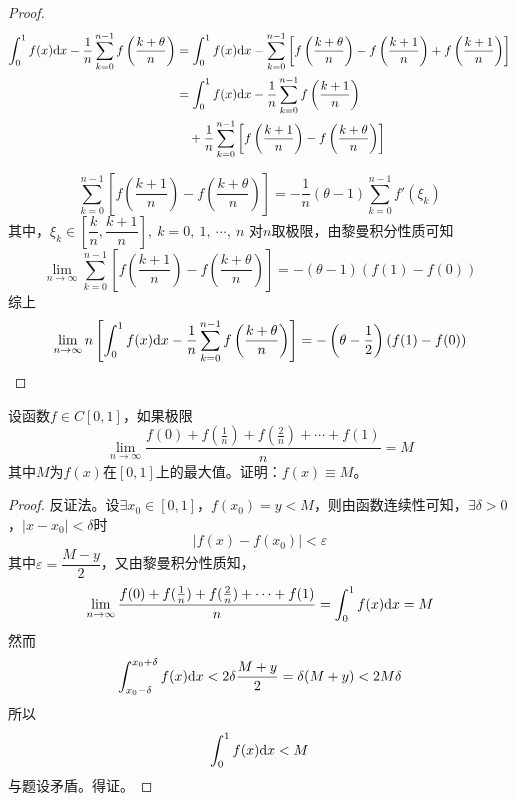 \begin{proof}
    
    \begin{align*}
        \int_{0}^{1}{f(x)}\mathrm{d} x - \dfrac{1}{n}\sum\limits_{k = 0}^{n - 1}{f\left(\dfrac{k + \theta}{n}\right)} & = \int_{0}^{1}{f(x)}\mathrm{d} x - \sum\limits_{k = 0}^{n - 1}{\left[f\left(\dfrac{k + \theta}{n}\right) - f\left(\dfrac{k + 1}{n}\right) + f\left(\dfrac{k + 1}{n}\right)\right]} \\
        & = \int_{0}^{1}{f(x)}\mathrm{d} x - \dfrac{1}{n}\sum\limits_{k = 0}^{n - 1}{f\left(\dfrac{k + 1}{n}\right)} \\
        & \quad + \dfrac{1}{n}\sum\limits_{k = 0}^{n - 1}{\left[f\left(\dfrac{k + 1}{n}\right) - f\left(\dfrac{k + \theta}{n}\right)\right]}
    \end{align*}

    $$\sum\limits_{k = 0}^{n - 1}{\left[f\left(\dfrac{k + 1}{n}\right) - f\left(\dfrac{k + \theta}{n}\right)\right]} = -\dfrac{1}{n}(\theta - 1)\sum\limits_{k = 0}^{n - 1}{f'(\xi_k)}$$
    其中，$\xi_k \in \left[\dfrac{k}{n}, \dfrac{k + 1}{n}\right],\ k = 0,\ 1,\  \cdots,\ n$
    对$n$取极限，由黎曼积分性质可知
    $$\lim\limits_{n\to\infty}{\sum\limits_{k = 0}^{n - 1}{\left[f\left(\dfrac{k + 1}{n}\right) - f\left(\dfrac{k + \theta}{n}\right)\right]}} = -(\theta - 1)(f(1) - f(0))$$
    综上
    $$\lim\limits_{n\to\infty}{n \left[\int_{0}^{1}{f(x)}\mathrm{d} x - \dfrac{1}{n}\sum\limits_{k = 0}^{n - 1}{f\left(\dfrac{k + \theta}{n}\right)}\right]} = -\left(\theta -\dfrac{1}{2}\right) (f(1) - f(0))$$

\end{proof}

\begin{proposition}

    设函数$f \in C[0,1]$，如果极限
    $$\lim\limits_{n\to\infty}{\dfrac{f(0) + f(\frac{1}{n}) + f(\frac{2}{n}) + \cdots + f(1)}{n}} = M$$
    其中$M$为$f(x)$在$[0,1]$上的最大值。证明：$f(x) \equiv M$。

\end{proposition}

\begin{proof}

    反证法。设$\exists x_0 \in [0,1]$，$f(x_0) = y < M$，则由函数连续性可知，$\exists \delta > 0$，$|x - x_0| < \delta$时
    $$|f(x) - f(x_0)| < \varepsilon$$
    其中$\varepsilon = \dfrac{M -y}{2}$，又由黎曼积分性质知，
    $$\lim\limits_{n\to\infty}{\dfrac{f(0) + f(\frac{1}{n}) + f(\frac{2}{n}) + \cdots + f(1)}{n}} = \int_{0}^{1}{f(x)}\mathrm{d} x = M$$
    然而
    $$\int_{x_0 - \delta}^{x_0 + \delta}{f(x)}\mathrm{d} x < 2 \delta \dfrac{M + y}{2} = \delta (M + y) < 2M \delta$$
    所以
    $$\int_{0}^{1}{f(x)}\mathrm{d} x < M$$
    与题设矛盾。得证。

\end{proof}

